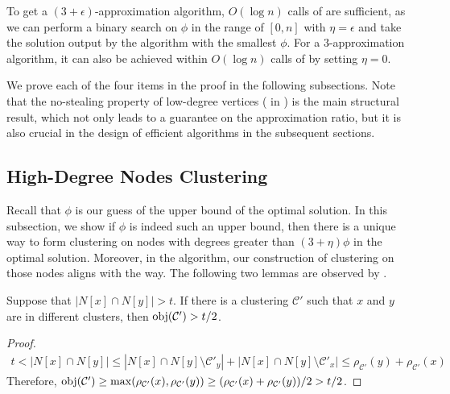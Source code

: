 \begin{remark} To get a $(3+\epsilon)$-approximation algorithm, $O(\log n)$ calls of   are sufficient, as we can perform a binary search on $\phi$ in the range of $[0,n]$ with $\eta=\epsilon$ and take the solution output by the algorithm with the smallest $\phi$. For a $3$-approximation algorithm, it can also be achieved within $O(\log n)$ calls of  by setting $\eta = 0$. \end{remark}

We prove each of the four items in the proof in the following subsections. Note that the no-stealing property of low-degree vertices ( in ) is the main structural result, which not only leads to a guarantee on the approximation ratio, but it is also crucial in the design of efficient algorithms in the subsequent sections. %

\subsection{High-Degree Nodes Clustering}
Recall that $\phi$ is our guess of the upper bound of the optimal solution.  In this subsection, we show if $\phi$ is indeed such an upper bound, then there is a unique way to form clustering on nodes with degrees greater than $(3+\eta)\phi$ in the optimal solution. Moreover, in the algorithm, our construction of clustering on those nodes aligns with the way. The following two lemmas are observed by \cite{heidrich20244}.


\begin{lemma}\label{lem:diffcluster} Suppose that $|N[x] \cap N[y]| > t$. If there is a clustering $\mathcal{C}'$ such that $x$ and $y$ are in different clusters, then $\mathrm{obj}(\mathcal{C}') > t/2$. \end{lemma}
\begin{proof}
\begin{align*}
t < |N[x] \cap N[y]| \leq |N[x] \cap N[y] \setminus \mathcal{C'}_{y}| + |N[x] \cap N[y] \setminus \mathcal{C'}_{x}| \leq \rho_{\mathcal{C}'}(y) + \rho_{\mathcal{C}'}(x)
\end{align*}
Therefore, $\mathrm{obj}(\mathcal{C}') \geq \max(\rho_{\mathcal{C'}}(x),  \rho_{\mathcal{C'}}(y)) \geq (\rho_{\mathcal{C'}}(x) + \rho_{\mathcal{C'}}(y) )/2 > t/2$.
\end{proof}

